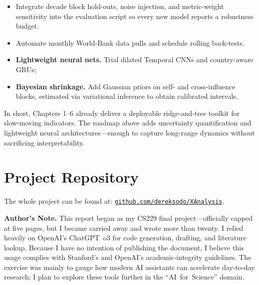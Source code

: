 \documentclass[12pt]{article}
\begin{document}
\begin{itemize}
  \item Integrate decade block hold-outs, noise injection, and metric-weight sensitivity into the evaluation script so every new model reports a robustness budget.
  \item Automate monthly World-Bank data pulls and schedule rolling back-tests.
  \item \textbf{Lightweight neural nets.}  Trial dilated Temporal CNNs and country-aware GRUs;
  \item \textbf{Bayesian shrinkage.}  Add Gaussian priors on self- and cross-influence blocks, estimated via variational inference to obtain calibrated intervals.
\end{itemize}


\bigskip
In short, Chapters 1–6 already deliver a deployable ridge-and-tree toolkit for slow-moving indicators.  
The roadmap above adds uncertainty quantification and lightweight neural architectures—enough to capture long-range dynamics without sacrificing interpretability.



\section*{Project Repository}
The whole project can be found at: \href{https://github.com/dereksodo/XAnalysis}{\texttt{github.com/dereksodo/XAnalysis}}.



\bigskip
\noindent\textbf{Author’s Note.}\;
This report began as my CS229 final project---officially capped at five pages, but I became carried away and wrote more than twenty.  I relied heavily on OpenAI’s ChatGPT o3 for code generation, drafting, and literature lookup.  Because I have no intention of publishing the document, I believe this usage complies with Stanford’s and OpenAI’s academic‐integrity guidelines.  The exercise was mainly to gauge how modern AI assistants can accelerate day‑to‑day research; I plan to explore these tools further in the “AI for Science” domain.



\end{document}
